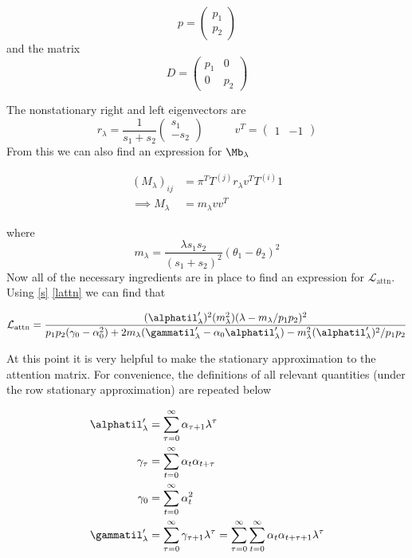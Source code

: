 \documentclass{article}
\begin{document}
$$
p = 
\begin{pmatrix}
	p_1 \\p_2
\end{pmatrix}
$$
and the matrix 
$$
D = 
\begin{pmatrix}
	p_1 & 0 \\
	0 &p_2
\end{pmatrix}
$$

The nonstationary right and left eigenvectors are 
$$
r_\lambda = \frac{1}{s_1+s_2}\begin{pmatrix}
	s_1 \\ -s_2 
\end{pmatrix} \;\;\;\;\;\;\;\;\;\;
v^T = 
\begin{pmatrix}
	1 & -1 
\end{pmatrix}
$$
From this we can also find an expression for $\Mb_\lambda$

\begin{align}
(M_\lambda)_{ij} &= \pi^T T^{(j)} r_\lambda v^T T^{(i)}1 \\
\implies M_\lambda &= m_\lambda vv^T
\end{align}

where 
\begin{equation}\label{mlambda}
m_\lambda = \frac{\lambda s_1 s_2}{(s_1 + s_2)^2}(\theta_1 - \theta_2)^2
\end{equation}
Now all of the necessary ingredients are in place to find an expression for $\mathcal{L}_{\text{attn}}$. Using \eqref{s} \eqref{lattn} we can find that 

\begin{equation}\label{lattn_stat}
    \mathcal{L}_{\text{attn}} = \frac{(\alphatil'_\lambda)^2(m_\lambda^2)(\lambda - m_\lambda/p_1p_2)^2}{p_1p_2(\gamma_0 - \alpha_0^2) + 2m_\lambda(\gammatil'_\lambda - \alpha_0\alphatil'_\lambda) - m_\lambda^2 (\alphatil'_\lambda)^2/p_1p_2}
\end{equation}

At this point it is very helpful to make the stationary approximation to the attention matrix. For convenience, the definitions of all relevant quantities (under the row stationary approximation) are repeated below

\begin{align}
    \alphatil'_\lambda &= \sum_{\tau=0}^\infty \alpha_{\tau+1}\lambda^\tau \\
    \gamma_\tau &= \sum_{t=0}^\infty \alpha_t \alpha_{t+\tau} \\
    \gamma_0 &= \sum_{t=0}^\infty\alpha_t^2\\
    \gammatil'_\lambda &= \sum_{\tau=0}^\infty\gamma_{\tau+1}\lambda^\tau = \sum_{\tau=0}^\infty\sum_{t=0}^\infty \alpha_t \alpha_{t+\tau+1}\lambda^\tau
\end{align}
\end{document}
